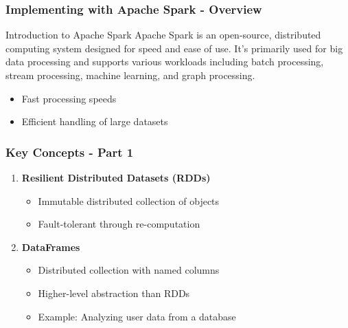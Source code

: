 \documentclass[aspectratio=169]{beamer}
\begin{document}
\begin{frame}[fragile]
    \frametitle{Implementing with Apache Spark - Overview}
    \begin{block}{Introduction to Apache Spark}
        Apache Spark is an open-source, distributed computing system designed for speed and ease of use. It’s primarily used for big data processing and supports various workloads including batch processing, stream processing, machine learning, and graph processing.
    \end{block}
    \begin{itemize}
        \item Fast processing speeds
        \item Efficient handling of large datasets
    \end{itemize}
\end{frame}

\begin{frame}[fragile]
    \frametitle{Key Concepts - Part 1}
    \begin{enumerate}
        \item \textbf{Resilient Distributed Datasets (RDDs)}
            \begin{itemize}
                \item Immutable distributed collection of objects
                \item Fault-tolerant through re-computation
            \end{itemize}
        \item \textbf{DataFrames}
            \begin{itemize}
                \item Distributed collection with named columns
                \item Higher-level abstraction than RDDs
                \item Example: Analyzing user data from a database
            \end{itemize}
    \end{enumerate}
\end{frame}
\end{document}
